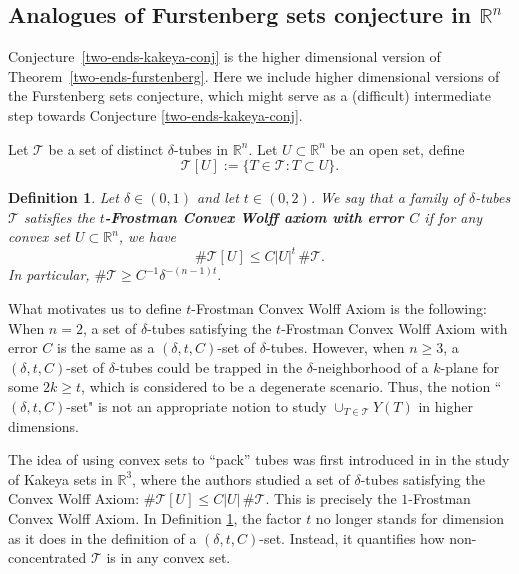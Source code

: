 \documentclass{amsart}
\numberwithin{equation}{section}
\newtheorem{definition}[theorem]{Definition}
\newcommand{\de}{\delta}
\newcommand{\cT}{{\mathcal T}}
\begin{document}
\medskip 

\subsection{Analogues of Furstenberg sets conjecture in \texorpdfstring{$\mathbb{R}^n$}{}}

Conjecture~\ref{two-ends-kakeya-conj} is the higher dimensional version of Theorem~\ref{two-ends-furstenberg}.
Here we include higher dimensional versions of the Furstenberg sets conjecture, which might serve as a (difficult) intermediate step towards Conjecture \ref{two-ends-kakeya-conj}. 

\smallskip

Let $\cT$ be a set of distinct $\delta$-tubes in $\mathbb{R}^n$. Let $U\subset \mathbb{R}^n$ be an open set, define
\begin{equation}
    \cT[U]:=\{ T \in \cT: T\subset U\}. 
\end{equation}


\begin{definition} \label{def: convexwolff}
Let $\de\in(0,1)$ and let $t\in (0, 2)$.
We say that a family of $\de$-tubes $\cT$ satisfies the {\bf $t$-Frostman Convex Wolff axiom with error $C$} if for any convex set $U\subset \mathbb{R}^n$, we have 
\begin{equation}
    \#\cT[U] \leq C |U|^t  \, \#\cT. 
\end{equation}
In particular, $\# \cT\geq C^{-1} \delta^{-(n-1)t}.$
\end{definition}

What motivates us to define $t$-Frostman Convex Wolff Axiom is the following: 
When $n=2$, a set of $\delta$-tubes satisfying the $t$-Frostman Convex Wolff Axiom with error $C$  is the same as a $(\delta, t, C)$-set of $\delta$-tubes. 
However, when $n\geq 3$, a $(\delta, t, C)$-set of $\delta$-tubes could be trapped in the $\delta$-neighborhood of a $k$-plane for some $2k\geq t$, which is considered to be a degenerate scenario. 
Thus, the notion ``$(\delta, t, C)$-set" is not an appropriate notion to study $\cup_{T\in \cT} Y(T)$ in higher dimensions. 

The idea of using convex sets to ``pack'' tubes was first introduced in  \cite{wang2024assouad} in the study of Kakeya sets in $\mathbb{R}^3$, where the authors studied a set of $\delta$-tubes satisfying the Convex Wolff Axiom: $\# \cT[U] \leq C|U| \, \#\cT$. 
This is precisely the $1$-Frostman Convex Wolff Axiom. 
In Definition \ref{def: convexwolff}, the factor $t$ no longer stands for dimension as it does in the definition of a $(\delta, t,C)$-set. 
Instead, it quantifies how non-concentrated $\cT$ is in any convex set. 
\end{document}
